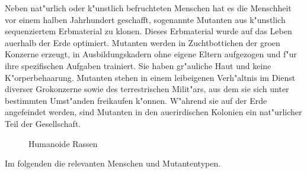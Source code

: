 
Neben nat"urlich oder k"unstlich befruchteten Menschen hat es die Menschheit vor einem halben Jahrhundert geschafft, sogenannte Mutanten aus k"unstlich sequenziertem Erbmaterial zu klonen. Dieses Erbmaterial wurde auf das Leben au\3erhalb der Erde optimiert. Mutanten werden in Zuchtbottichen der gro\3en Konzerne erzeugt, in Ausbildungskadern ohne eigene Eltern aufgezogen und f"ur ihre spezifischen Aufgaben trainiert. Sie haben gr"auliche Haut und keine K"orperbehaarung. Mutanten stehen in einem leibeigenen Verh"altnis im Dienst diverser Gro\3konzerne sowie des terrestrischen Milit"ars, aus dem sie sich unter bestimmten Umst"anden freikaufen k"onnen. W"ahrend sie auf der Erde angefeindet werden, sind Mutanten in den au\3erirdischen Kolonien ein nat"urlicher Teil der Gesellschaft.

\begin{figure}[htbp]
      \centering
      \newline{}Humanoide Rassen
      \label{fig:humanoide-rassen}
\end{figure}
    

Im folgenden die relevanten Menschen und Mutantentypen.

